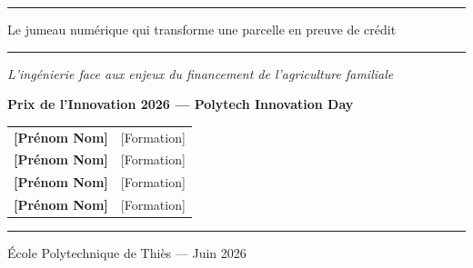 \documentclass[12pt, a4paper]{article}
\begin{document}

\thispagestyle{empty}

\vspace*{1cm}

\begin{center}


  \vspace{0.2cm}
  {\color{rule}\rule{5cm}{0.4pt}}

  \vspace{1.8cm}
  {\Huge\textbf{\textcolor{primary}{}}}

  \vspace{0.5cm}
  {\large\textcolor{accent}{Le jumeau numérique qui transforme une parcelle en preuve de crédit}}

  \vspace{0.4cm}
  \textcolor{rule}{\rule{10cm}{0.4pt}}

  \vspace{0.6cm}
  {\normalsize\textcolor{muted}{\itshape
    \og{}L'ingénierie face aux enjeux du financement de l'agriculture familiale\fg{}}}

  \vspace{0.3cm}
  {\small\textbf{\textcolor{dark}{Prix de l'Innovation 2026 — Polytech Innovation Day}}}

  \vspace{2.6cm}

  \begin{tabular}{ll}
    \textcolor{primary}{\textbf{[Prénom Nom]}} & [Formation] \\[5pt]
    \textcolor{primary}{\textbf{[Prénom Nom]}} & [Formation] \\[5pt]
    \textcolor{primary}{\textbf{[Prénom Nom]}} & [Formation] \\[5pt]
    \textcolor{primary}{\textbf{[Prénom Nom]}} & [Formation] \\
  \end{tabular}

  \vspace{1.3cm}
  \textcolor{rule}{\rule{10cm}{0.4pt}}

  \vspace{0.4cm}
  {\small\textcolor{muted}{École Polytechnique de Thiès \quad — \quad Juin 2026}}

\end{center}
\end{document}
